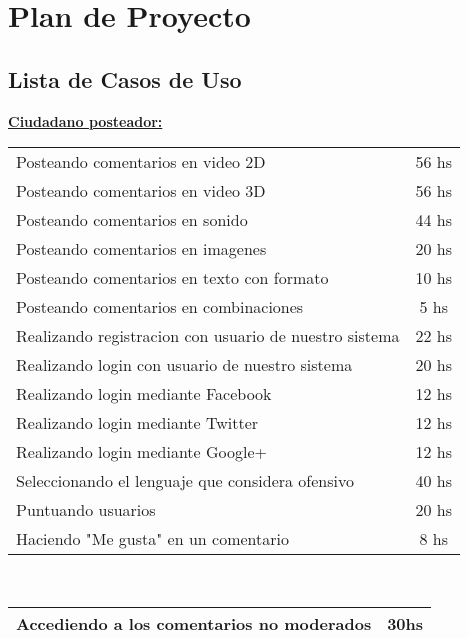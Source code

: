 \section{Plan de Proyecto}
\subsection{Lista de Casos de Uso}

\uline{\bf{\large{Ciudadano posteador:}}}\\
\begin{center}
\begin{tabular}{||l | c||} \hline \hline
Posteando comentarios en video 2D     &                  56 hs\\
Posteando comentarios en video 3D      &                 56 hs\\
Posteando comentarios en sonido         &                44 hs\\
Posteando comentarios en imagenes        &               20 hs\\
Posteando comentarios en texto con formato &             10 hs\\
Posteando comentarios en combinaciones      &            5 hs\\
Realizando registracion con usuario de nuestro sistema &        22 hs\\
Realizando login con usuario de nuestro sistema &        20 hs\\
Realizando login mediante Facebook               &       12 hs\\
Realizando login mediante Twitter                 &      12 hs\\
Realizando login mediante Google+                  &     12 hs\\
Seleccionando el lenguaje que considera ofensivo    &    40 hs\\
Puntuando usuarios                                   &   20 hs\\
Haciendo "Me gusta" en un comentario               &     8 hs\\ \hline  \hline
\end{tabular}
\end{center}

\\
\begin{center}
\begin{tabular}{||l | c||} \hline  \hline
Accediendo a los comentarios no moderados       &        30hs\\ \hline \hline
\end{tabular}
\end{center}


